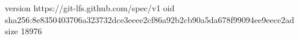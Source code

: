 version https://git-lfs.github.com/spec/v1
oid sha256:8e8350403706a323732dce3eeee2cf86a92b2cb90a5da678f99094ee9eece2ad
size 18976
